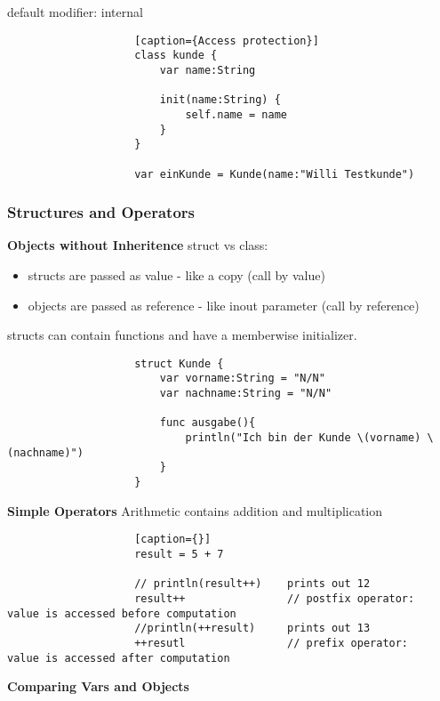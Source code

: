 				default modifier: internal

				\begin{lstlisting}
					[caption={Access protection}]
					class kunde {
						var name:String

						init(name:String) {
							self.name = name
						}
					}

					var einKunde = Kunde(name:"Willi Testkunde")
				\end{lstlisting}
		\subsubsection{Structures and Operators}

			\textbf{Objects without Inheritence}
				struct vs class:
				\begin{itemize}
					\item structs are passed as value - like a copy					(call by value)
					\item objects are passed as reference - like inout parameter	(call by reference)
				\end{itemize}

				structs can contain functions and have a memberwise initializer.
				\begin{lstlisting}
					struct Kunde {
						var vorname:String = "N/N"
						var nachname:String = "N/N"

						func ausgabe(){
							println("Ich bin der Kunde \(vorname) \(nachname)")
						} 
					}

				\end{lstlisting}

			\textbf{Simple Operators}
				Arithmetic contains addition and multiplication

				\begin{lstlisting}
					[caption={}]
					result = 5 + 7

					// println(result++) 	prints out 12
					result++				// postfix operator: 	value is accessed before computation
					//println(++result)		prints out 13
					++resutl				// prefix operator: 	value is accessed after computation
				\end{lstlisting}

			\textbf{Comparing Vars and Objects}

			\textbf{}